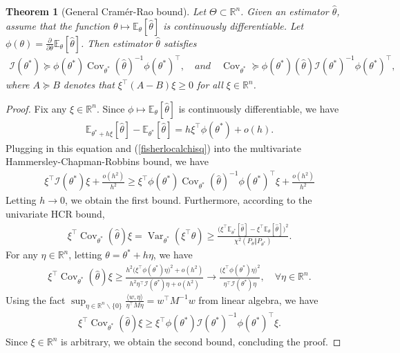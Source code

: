\documentclass{article}
\numberwithin{equation}{section}
\newcommand{\E}{\mathbb{E}}
\newcommand{\bbR}{\mathbb{R}}
\renewcommand{\cal}{\mathcal}
\newcommand{\wh}{\widehat}
\DeclareMathOperator{\cov}{Cov}
\DeclareMathOperator{\var}{Var}
\theoremstyle{plain}
\newtheorem{theorem}{Theorem}[section]
\theoremstyle{definition}
\begin{document}
\begin{theorem}[General Cramér-Rao bound]\label{generalcramerrao}
Let $\Theta\subset\bbR^n$. Given an estimator $\wh\theta$, assume that the function $\theta\mapsto\E_\theta[\wh\theta]$ is continuously differentiable. Let $\phi(\theta)=\frac{\partial}{\partial\theta}\E_\theta[\wh\theta]$. Then estimator $\wh\theta$ satisfies
\begin{align*}
\cal{I}(\theta^*)\succeq\phi(\theta^*)\cov_{\theta^*}(\wh\theta)^{-1}\phi(\theta^*)^\top,\quad and\quad 
\cov_{\theta^*}\succeq\phi(\theta^*)(\wh\theta)\cal{I}(\theta^*)^{-1}\phi(\theta^*)^\top,
\end{align*}
where $A\succeq B$ denotes that $\xi^\top(A-B)\xi\geq 0$ for all $\xi\in\bbR^n$.
\end{theorem}
\begin{proof}
Fix any $\xi\in\bbR^n$. Since $\phi\mapsto\E_\theta[\wh{\theta}]$ is continuously differentiable, we have
\begin{align*}
\E_{\theta^*+h\xi}[\wh{\theta}]-\E_{\theta^*}[\wh{\theta}]=h\xi^\top\phi(\theta^*)+o(h).
\end{align*}
Plugging in this equation and (\ref{fisherlocalchisq}) into the multivariate Hammersley-Chapman-Robbins bound, we have
\begin{align*}
	\xi^\top\cal{I}(\theta^*)\xi+\frac{o(h^2)}{h^2}\geq \xi^\top\phi(\theta^*)\cov_{\theta^*}(\wh\theta)^{-1}\phi(\theta^*)^\top\xi+\frac{o(h^2)}{h^2}
\end{align*}
Letting $h\to 0$, we obtain the first bound. Furthermore, according to the univariate HCR bound,
\begin{align*}
	\xi^\top\cov_{\theta^*}(\wh{\theta})\xi=\var_{\theta^*}(\xi^\top\wh{\theta})\geq\frac{\bigl(\xi^\top\E_{\theta^*}[\wh{\theta}]-\xi^\top\E_{\theta}[\wh{\theta}]\bigr)^2}{\chi^2(P_\theta\Vert P_{\theta^*})}.
\end{align*}
For any $\eta\in\bbR^n$, letting $\theta=\theta^*+h\eta$, we have
\begin{align*}
	\xi^\top\cov_{\theta^*}(\wh{\theta})\xi\geq\frac{h^2\bigl(\xi^\top\phi(\theta^*)\eta\bigr)^2+o(h^2)}{h^2\eta^\top\cal{I}(\theta^*)\eta+o(h^2)}\to\frac{\bigl(\xi^\top\phi(\theta^*)\eta\bigr)^2}{\eta^\top\cal{I}(\theta^*)\eta},\quad\forall\eta\in\bbR^n.
\end{align*}
Using the fact $\sup_{\eta\in\bbR^n\backslash\{0\}}\frac{\langle w,\eta\rangle}{\eta^\top M\eta}=w^\top M^{-1}w$ from linear algebra, we have
\begin{align*}
	\xi^\top\cov_{\theta^*}(\wh{\theta})\xi\geq\xi^\top\phi(\theta^*)\cal{I}(\theta^*)^{-1}\phi(\theta^*)^\top\xi.
\end{align*}
Since $\xi\in\bbR^n$ is arbitrary, we obtain the second bound, concluding the proof.
\end{proof}
\end{document}
